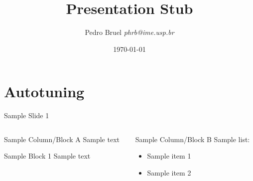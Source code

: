 \documentclass[10pt, compress, aspectratio=169, xcolor={table,usenames,dvipsnames}]{beamer}
\author{\footnotesize Pedro Bruel \newline \scriptsize \emph{phrb@ime.usp.br}}
\date{\scriptsize \today}
\title{Presentation Stub}
\begin{document}
\maketitle

\section{Autotuning}
\label{sec:orgbc2ace9}
\begin{frame}[label={sec:org2142d26}]{Sample Slide 1}
\begin{columns}
\begin{column}{0.5\columnwidth}
\begin{block}{Sample Column/Block A}
Sample text

\begin{block}{Sample Block 1}
Sample \alert{text}
\end{block}
\end{block}
\end{column}

\begin{column}{0.5\columnwidth}
\begin{block}{Sample Column/Block B}
Sample list:

\begin{itemize}
\item Sample item 1
\item Sample item 2
\end{itemize}
\end{block}
\end{column}
\end{columns}
\end{frame}
\maketitle
\end{document}
